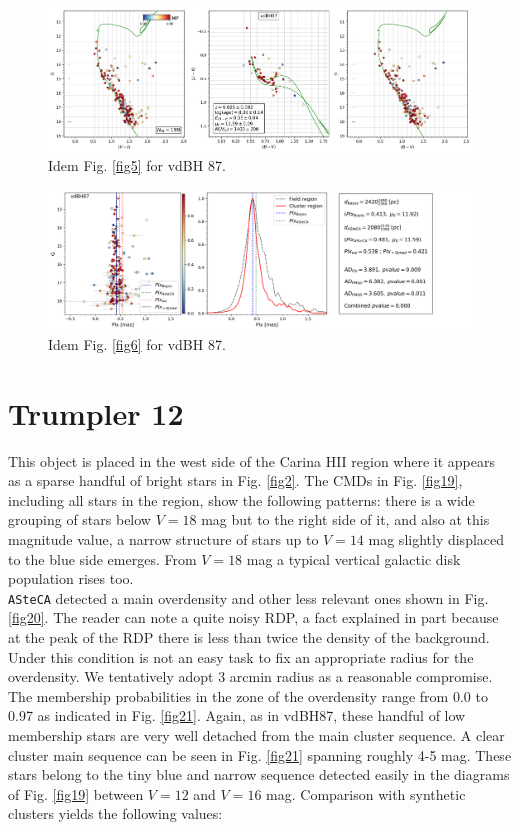 \documentclass[draft]{aa}
\begin{document}
\begin{figure}[ht]
    \centering
    \includegraphics[width=\hsize]{../figs/cmds_vdbh87.png}
    \caption{Idem Fig. \ref{fig5} for vdBH 87.}
    \label{fig17}
\end{figure}
\begin{figure}[ht]
    \centering
    \includegraphics[width=\hsize]{../figs/plx_vdBH87.png}
    \caption{Idem Fig. \ref{fig6} for vdBH 87.}
    \label{fig18}
\end{figure}




\section{Trumpler 12}

This object is placed in the west side of the Carina HII region where it appears
as a sparse handful of bright stars in Fig. \ref{fig2}. The CMDs in Fig.
\ref{fig19}, including all stars in the region, show the following patterns:
there is a wide grouping of stars below $V = 18$ mag but to the right side of
it, and also at this magnitude value, a narrow structure of stars up to $V= 14$
mag slightly displaced to the blue side emerges. From $V = 18$ mag a typical
vertical galactic disk population rises too.\\

\texttt{ASteCA} detected a main overdensity and other less relevant ones shown
in Fig. \ref{fig20}. The reader can note a quite noisy RDP, a fact explained in
part because at the peak of the RDP there is less than twice the density of the
background. Under this condition is not an easy task to fix an appropriate
radius for the overdensity. We tentatively adopt 3 arcmin radius as a reasonable
compromise. The membership probabilities in the zone of the overdensity range
from 0.0 to 0.97 as indicated in Fig. \ref{fig21}. Again, as in vdBH87, these
handful of low membership stars are very well detached from the main
cluster sequence.
%
A clear cluster main sequence can be seen in Fig. \ref{fig21} spanning roughly
4-5 mag. These stars belong to the tiny blue and narrow sequence detected
easily in the diagrams of Fig. \ref{fig19} between $V=12$ and $V=16$
mag. Comparison with synthetic clusters yields the following values:
\end{document}
